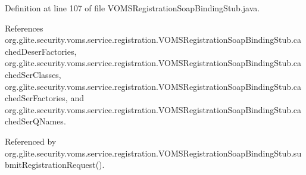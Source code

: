 Definition at line 107 of file VOMSRegistrationSoapBindingStub.java.



References org.glite.security.voms.service.registration.VOMSRegistrationSoapBindingStub.cachedDeserFactories, org.glite.security.voms.service.registration.VOMSRegistrationSoapBindingStub.cachedSerClasses, org.glite.security.voms.service.registration.VOMSRegistrationSoapBindingStub.cachedSerFactories, and org.glite.security.voms.service.registration.VOMSRegistrationSoapBindingStub.cachedSerQNames.



Referenced by org.glite.security.voms.service.registration.VOMSRegistrationSoapBindingStub.submitRegistrationRequest().


\begin{DoxyCode}
                                                                                 

\end{DoxyCode}
